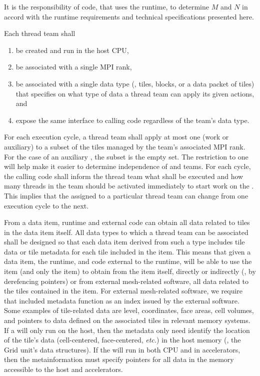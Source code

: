 \documentclass{article}
\begin{document}
It is the responsibility of code, that uses the runtime, to determine $M$ and $N$ in
accord with the runtime requirements and technical specifications presented
here.

\begin{req}
Each thread team shall
\begin{enumerate}
\item{be created and run in the host CPU,}
\item{be associated with a single MPI rank,}
\item{be associated with a single data type (\eg, tiles, blocks, or a
data packet of tiles) that specifies on what type of data a thread team can
apply its given actions, and}
\item{expose the same interface to calling code regardless of the team's data
type.}
\end{enumerate}
\end{req}

\begin{req}
For each execution cycle, a thread team shall apply at
most one \taskroutine (work or auxiliary) to a subset of the tiles managed by
the team's associated MPI rank.  For the case of an auxiliary \taskroutine, the
subset is the empty set.  The restriction to one \taskroutine will help make it
easier to determine independence of \taskroutines and teams.  For each cycle,
the calling code shall inform the thread team what \taskroutine shall be executed
and how many threads in the team should be activated immediately to start work
on the \taskroutine.  This implies that the \taskroutine assigned to a
particular thread team can change from one execution cycle to the next.
\end{req}

\begin{req}
From a data item, runtime and external code can obtain all data related to tiles
in the data item itself.
All data types to which a thread team can be associated shall be designed so
that each data item derived from such a type includes tile data or tile metadata
for each tile included in the item.  This means that given a data item, the
runtime, and code external to the runtime, will be able to use the item (and only
the item) to obtain from the item itself, directly or indirectly (\ie, by
derefencing pointers) or from external mesh-related software, all data related to
the tiles contained in the item.  For external mesh-related software, we
require that included metadata function as an index issued by the external
software.  Some examples of tile-related data are level, coordinates, face
areas, cell volumes, and pointers to data defined on the associated tiles in
relevant memory systems.  If a \taskroutine will only run on the host, then the
metadata only need identify the location of the tile's data (cell-centered,
face-centered, \textit{etc.}) in the host memory (\ie, the Grid unit's data
structures).  If the \taskroutine will run in both CPU and in accelerators, then
the metainformation must specify pointers for all data in the memory accessible
to the host and accelerators.
\end{req}
\end{document}
